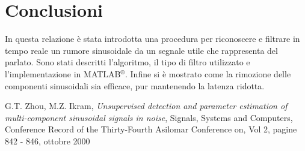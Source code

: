 \documentclass[10pt,A4]{article}
\begin{document}
\section{Conclusioni}
In questa relazione è stata introdotta una procedura per riconoscere e filtrare in tempo reale un rumore sinusoidale da un segnale utile che rappresenta del parlato. Sono stati descritti l'algoritmo, il tipo di filtro utilizzato e l'implementazione in MATLAB$^{\circledR}$. Infine si è mostrato come la rimozione delle componenti sinusoidali sia efficace, pur mantenendo la latenza ridotta. \\

\begin{thebibliography}[1]

    G.T. Zhou, M.Z. Ikram, \emph{Unsupervised detection and parameter estimation of multi-component sinusoidal signals in noise}, Signals, Systems and Computers, Conference Record of the Thirty-Fourth Asilomar Conference on, Vol 2, pagine 842 - 846, ottobre 2000

\end{thebibliography}
\end{document}
